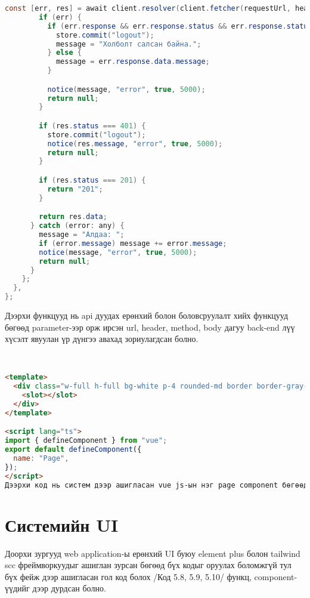 \begin{lstlisting}[language=java, caption=API дуудсан фунцаас ирсэн response дээр боловсруулалт хийх функц, frame=single]
        const [err, res] = await client.resolver(client.fetcher(requestUrl, headers, method, data));
        if (err) {
          if (err.response && err.response.status && err.response.status === 401) {
            store.commit("logout");
            message = "Холболт салсан байна.";
          } else {
            message = err.response.data.message;
          }

          notice(message, "error", true, 5000);
          return null;
        }

        if (res.status === 401) {
          store.commit("logout");
          notice(res.message, "error", true, 5000);
          return null;
        }

        if (res.status === 201) {
          return "201";
        }

        return res.data;
      } catch (error: any) {
        message = "Алдаа: ";
        if (error.message) message += error.message;
        notice(message, "error", true, 5000);
        return null;
      }
    };
  },
};

\end{lstlisting}

Дээрхи функцууд нь api дуудах ерөнхий болон боловсруулалт хийх функцууд бөгөөд parameter-ээр орж ирсэн url, header, method, body дагуу back-end лүү хүсэлт явуулан үр дүнгээ авахад зориулагдсан болно.


\\ 
\begin{lstlisting}[language=HTML, caption=API дуудах үндсэн глобар функц, frame=single]
<template>
  <div class="w-full h-full bg-white p-4 rounded-md border border-gray-200 shadow overflow-y-auto overflow-x-hidden">
    <slot></slot>
  </div>
</template>

<script lang="ts">
import { defineComponent } from "vue";
export default defineComponent({
  name: "Page",
});
</script>
Дээрхи код нь систем дээр ашигласан vue js-ын нэг page component бөгөөд Код 5.7 дээр глобалчилагдан бүх фейж дээр ашигладаг component юм.

\end{lstlisting}

\section{Системийн UI} 

Доорхи зургууд web application-ы ерөнхий UI буюу element plus болон tailwind scc фреймворкуудыг ашиглан зурсан бөгөөд бүх кодыг оруулах боломжгүй тул бүх фейж дээр ашигласан гол код болох /Код 5.8, 5.9, 5.10/ функц, component-үүдийг дээр дурдсан болно.

